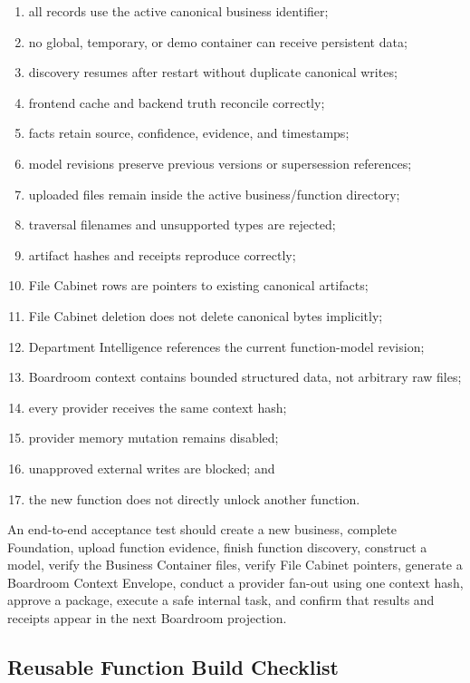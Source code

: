 \begin{enumerate}
  \item all records use the active canonical business identifier;
  \item no global, temporary, or demo container can receive persistent data;
  \item discovery resumes after restart without duplicate canonical writes;
  \item frontend cache and backend truth reconcile correctly;
  \item facts retain source, confidence, evidence, and timestamps;
  \item model revisions preserve previous versions or supersession references;
  \item uploaded files remain inside the active business/function directory;
  \item traversal filenames and unsupported types are rejected;
  \item artifact hashes and receipts reproduce correctly;
  \item File Cabinet rows are pointers to existing canonical artifacts;
  \item File Cabinet deletion does not delete canonical bytes implicitly;
  \item Department Intelligence references the current function-model revision;
  \item Boardroom context contains bounded structured data, not arbitrary raw
  files;
  \item every provider receives the same context hash;
  \item provider memory mutation remains disabled;
  \item unapproved external writes are blocked; and
  \item the new function does not directly unlock another function.
\end{enumerate}

An end-to-end acceptance test should create a new business, complete Foundation,
upload function evidence, finish function discovery, construct a model, verify
the Business Container files, verify File Cabinet pointers, generate a Boardroom
Context Envelope, conduct a provider fan-out using one context hash, approve a
package, execute a safe internal task, and confirm that results and receipts
appear in the next Boardroom projection.

\subsection{Reusable Function Build Checklist}

